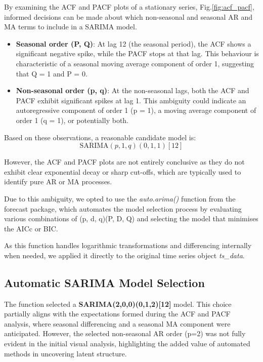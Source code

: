 By examining the ACF and PACF plots of a stationary series, Fig.\ref{fig:acf_pacf}, informed decisions can be made about which non-seasonal and seasonal AR and MA terms to include in a SARIMA model.\\

\begin{itemize}
\item \textbf{Seasonal order (P, Q)}:
    At lag 12 (the seasonal period), the ACF shows a significant negative spike, while the PACF stops at that lag. This behaviour is characteristic of a seasonal moving average component of order 1, suggesting that Q = 1 and P = 0.

\item \textbf{Non-seasonal order (p, q)}:
    At the non-seasonal lags, both the ACF and PACF exhibit significant spikes at lag 1. This ambiguity could indicate an autoregressive component of order 1 (p = 1), a moving average component of order 1 (q = 1), or potentially both.
\end{itemize}

Based on these observations, a reasonable candidate model is:
\[
\text{SARIMA}(p,1,q)(0,1,1)[12]
\]

However, the ACF and PACF plots are not entirely conclusive as they do not exhibit clear exponential decay or sharp cut-offs, which are typically used to identify pure AR or MA processes.

Due to this ambiguity, we opted to use the \textit{auto.arima()} function from the forecast package, which automates the model selection process by evaluating various combinations of (p, d, q)(P, D, Q) and selecting the model that minimises the AICc or BIC.

As this function handles logarithmic transformations and differencing internally when needed, we applied it directly to the original time series object \textit{ts\_data}.

\subsection{Automatic SARIMA Model Selection}

The function selected a \textbf{SARIMA(2,0,0)(0,1,2)[12]} model. This choice partially aligns with the expectations formed during the ACF and PACF analysis, where seasonal differencing and a seasonal MA component were anticipated. However, the selected non-seasonal AR order (p=2) was not fully evident in the initial visual analysis, highlighting the added value of automated methods in uncovering latent structure.\\

